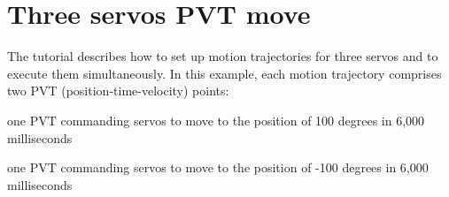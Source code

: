\hypertarget{group__tutor__c__servomove3}{}\section{Three servos P\+VT move}
\label{group__tutor__c__servomove3}
The tutorial describes how to set up motion trajectories for three servos and to execute them simultaneously. In this example, each motion trajectory comprises two P\+VT (position-\/time-\/velocity) points\+: 
\begin{DoxyItemize}
\item one P\+VT commanding servos to move to the position of 100 degrees in 6,000 milliseconds 
\item one P\+VT commanding servos to move to the position of -\/100 degrees in 6,000 milliseconds
\end{DoxyItemize}



